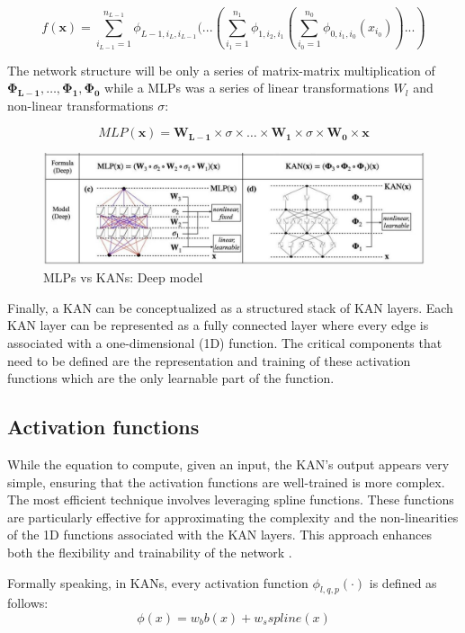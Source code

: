 $$f(\textbf{x}) = \sum_{i_{L-1}=1}^{n_{L-1}}  \phi_{L-1,i_L,i_{L-1}} (...(\sum_{i_1=1}^{n_{1}}  \phi_{1,i_2,i_{1}}(\sum_{i_0=1}^{n_{0}}  \phi_{0,i_1,i_{0}}(x_{i_0}))...)$$

The network structure will be only a series of matrix-matrix multiplication of $ \boldsymbol{\Phi_{L-1}}, \dots, \boldsymbol{\Phi_{1}},\boldsymbol{\Phi_{0}}$  while a MLPs was a series of linear transformations $W_l$ and non-linear transformations $\sigma$:

$$MLP(\textbf{x}) = \boldsymbol{W_{L-1}} \times \sigma \times \dots \times \boldsymbol{W_{1}} \times \sigma \times\boldsymbol{W_{0}} \times \textbf{x}$$

\begin{figure}[H]
    \centering
    \includegraphics[width=0.8\linewidth]{Images/B.JPG}
    \caption{ MLPs vs KANs: Deep model }
\end{figure}

Finally, a KAN can be conceptualized as a structured stack of KAN layers. Each KAN layer can be represented as a fully connected layer where every edge is associated with a one-dimensional (1D) function. The critical components that need to be defined are the representation and training of these activation functions which are the only learnable part of the function.

\subsection{Activation functions}
While the equation to compute, given an input, the KAN's output appears very simple, ensuring that the activation functions are well-trained is more complex. The most efficient technique involves leveraging spline functions. These functions are particularly effective for approximating the complexity and the non-linearities of the 1D functions associated with the KAN layers. This approach enhances both the flexibility and trainability of the network \cite{KAN}.

Formally speaking, in KANs, every activation function $\phi_{l,q,p}(\cdot)$ is defined as follows:
$$\phi(x) = w_bb(x) + w_sspline(x) $$

